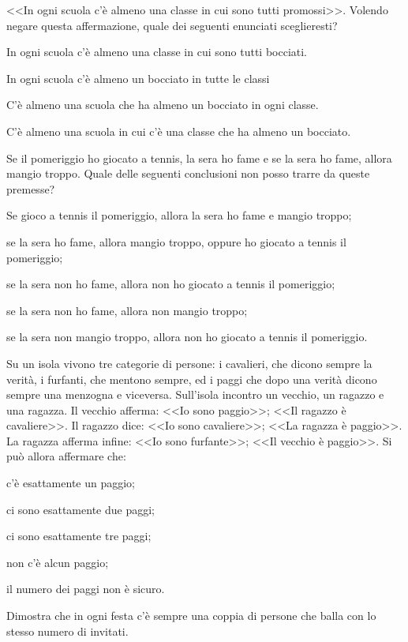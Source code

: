 \begin{esercizio}
\label{ese:\thechapter.23}
<<In ogni scuola c'è almeno una classe in cui sono tutti promossi>>. Volendo negare questa affermazione, quale dei seguenti
enunciati sceglieresti?
\begin{enumeratea}
\item In ogni scuola c'è almeno una classe in cui sono tutti bocciati.
\item In ogni scuola c'è almeno un bocciato in tutte le classi
\item C'è almeno una scuola che ha almeno un bocciato in ogni classe.
\item C'è almeno una scuola in cui c'è una classe che ha almeno un bocciato.
\end{enumeratea}
\end{esercizio}

\begin{esercizio}
\label{ese:\thechapter.24}
Se il pomeriggio ho giocato a tennis, la sera ho fame e se la sera ho fame, allora mangio troppo. Quale delle seguenti conclusioni non posso trarre da queste premesse?
\begin{enumeratea}
\item Se gioco a tennis il pomeriggio, allora la sera ho fame e mangio troppo;
\item se la sera ho fame, allora mangio troppo, oppure ho giocato a tennis il pomeriggio;
\item se la sera non ho fame, allora non ho giocato a tennis il pomeriggio;
\item se la sera non ho fame, allora non mangio troppo;
\item se la sera non mangio troppo, allora non ho giocato a tennis il pomeriggio.
\end{enumeratea}
\end{esercizio}

\begin{esercizio}
\label{ese:\thechapter.25}
Su un isola vivono tre categorie di persone: i cavalieri, che
dicono sempre la verità, i furfanti, che mentono sempre, ed i paggi che
dopo una verità dicono sempre una menzogna e viceversa.
Sull'isola incontro un vecchio, un ragazzo e una ragazza. Il vecchio afferma: <<Io sono paggio>>; <<Il ragazzo è
cavaliere>>. Il ragazzo dice: <<Io sono cavaliere>>; <<La ragazza è
paggio>>. La ragazza afferma infine: <<Io sono furfante>>; <<Il vecchio è
paggio>>. Si può allora affermare che:
\begin{enumeratea}
\item c'è esattamente un paggio;
\item ci sono esattamente due paggi;
\item ci sono esattamente tre paggi;
\item non c'è alcun paggio;
\item il numero dei paggi non è sicuro.
\end{enumeratea}
\end{esercizio}

\begin{esercizio}
\label{ese:\thechapter.26}
 Dimostra che in ogni festa c'è sempre una coppia
di persone che balla con lo stesso numero di invitati.
\end{esercizio}
